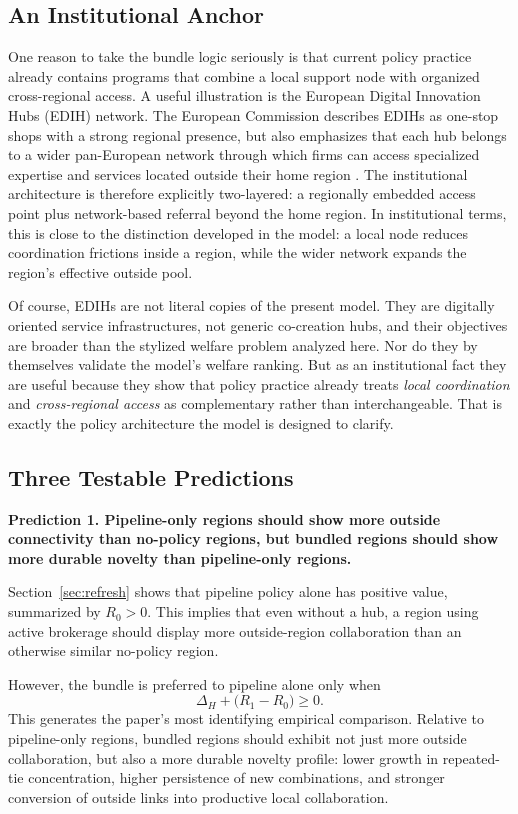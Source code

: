 \subsection{An Institutional Anchor}

One reason to take the bundle logic seriously is that current policy practice already contains programs that combine a local support node with organized cross-regional access. A useful illustration is the European Digital Innovation Hubs (EDIH) network. The European Commission describes EDIHs as one-stop shops with a strong regional presence, but also emphasizes that each hub belongs to a wider pan-European network through which firms can access specialized expertise and services located outside their home region \citep{EuropeanCommission2025EDIH}. The institutional architecture is therefore explicitly two-layered: a regionally embedded access point plus network-based referral beyond the home region. In institutional terms, this is close to the distinction developed in the model: a local node reduces coordination frictions inside a region, while the wider network expands the region's effective outside pool.

Of course, EDIHs are not literal copies of the present model. They are digitally oriented service infrastructures, not generic co-creation hubs, and their objectives are broader than the stylized welfare problem analyzed here. Nor do they by themselves validate the model's welfare ranking. But as an institutional fact they are useful because they show that policy practice already treats \emph{local coordination} and \emph{cross-regional access} as complementary rather than interchangeable. That is exactly the policy architecture the model is designed to clarify.

\subsection{Three Testable Predictions}

\noindent\textbf{Prediction 1. Pipeline-only regions should show more outside connectivity than no-policy regions, but bundled regions should show more durable novelty than pipeline-only regions.}

Section~\ref{sec:refresh} shows that pipeline policy alone has positive value, summarized by $R_0>0$. This implies that even without a hub, a region using active brokerage should display more outside-region collaboration than an otherwise similar no-policy region.

However, the bundle is preferred to pipeline alone only when
\[
\Delta_H+\bigl(R_1-R_0\bigr)\ge 0.
\]
This generates the paper's most identifying empirical comparison. Relative to pipeline-only regions, bundled regions should exhibit not just more outside collaboration, but also a more durable novelty profile: lower growth in repeated-tie concentration, higher persistence of new combinations, and stronger conversion of outside links into productive local collaboration.

